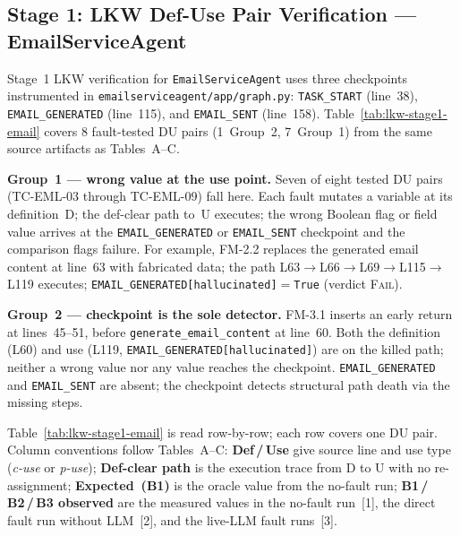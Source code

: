 \documentclass[sigconf,review,anonymous,balance=false]{acmart}
\begin{document}
\subsection{Stage 1: LKW Def-Use Pair Verification --- EmailServiceAgent}
\label{sec:lkw-stage1-email}

Stage~1 LKW verification for \texttt{EmailServiceAgent} uses three checkpoints
instrumented in \texttt{emailserviceagent/app/graph.py}: \texttt{TASK\_START}
(line~38), \texttt{EMAIL\_GENERATED} (line~115), and \texttt{EMAIL\_SENT}
(line~158).
Table~\ref{tab:lkw-stage1-email} covers 8 fault-tested DU pairs (1~Group~2,
7~Group~1) from the same source artifacts as Tables~A--C.

\textbf{Group~1 --- wrong value at the use point.}
Seven of eight tested DU pairs (TC-EML-03 through TC-EML-09) fall here.
Each fault mutates a variable at its definition~D; the def-clear path to~U
executes; the wrong Boolean flag or field value arrives at the
\texttt{EMAIL\_GENERATED} or \texttt{EMAIL\_SENT} checkpoint and the comparison
flags failure.
For example, FM-2.2 replaces the generated email content at line~63 with
fabricated data; the path L63$\to$L66$\to$L69$\to$L115$\to$L119 executes;
\texttt{EMAIL\_GENERATED[hallucinated]}$=$\texttt{True} (verdict \textsc{Fail}).

\textbf{Group~2 --- checkpoint is the sole detector.}
FM-3.1 inserts an early return at lines~45--51, before
\texttt{generate\_email\_content} at line~60.
Both the definition (L60) and use (L119, \texttt{EMAIL\_GENERATED[hallucinated]})
are on the killed path; neither a wrong value nor any value reaches the
checkpoint.
\texttt{EMAIL\_GENERATED} and \texttt{EMAIL\_SENT} are absent; the checkpoint
detects structural path death via the missing steps.

Table~\ref{tab:lkw-stage1-email} is read row-by-row; each row covers one DU
pair.
Column conventions follow Tables~A--C:
\textbf{Def\,/\,Use} give source line and use type (\emph{c-use} or
\emph{p-use});
\textbf{Def-clear path} is the execution trace from D to U with no
re-assignment;
\textbf{Expected~(B1)} is the oracle value from the no-fault run;
\textbf{B1\,/\,B2\,/\,B3 observed} are the measured values in the
no-fault run~[1], the direct fault run without LLM~[2], and the live-LLM
fault runs~[3].
\end{document}
